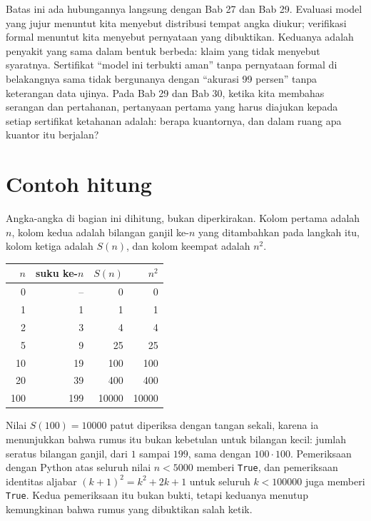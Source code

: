 Batas ini ada hubungannya langsung dengan Bab 27 dan Bab 29. Evaluasi model yang jujur menuntut
kita menyebut distribusi tempat angka diukur; verifikasi formal menuntut kita menyebut pernyataan
yang dibuktikan. Keduanya adalah penyakit yang sama dalam bentuk berbeda: klaim yang tidak
menyebut syaratnya. Sertifikat ``model ini terbukti aman'' tanpa pernyataan formal di belakangnya
sama tidak bergunanya dengan ``akurasi 99 persen'' tanpa keterangan data ujinya. Pada Bab 29 dan
Bab 30, ketika kita membahas serangan dan pertahanan, pertanyaan pertama yang harus diajukan
kepada setiap sertifikat ketahanan adalah: berapa kuantornya, dan dalam ruang apa kuantor itu
berjalan?

\section{Contoh hitung}


Angka-angka di bagian ini dihitung, bukan diperkirakan. Kolom pertama adalah $n$, kolom kedua
adalah bilangan ganjil ke-$n$ yang ditambahkan pada langkah itu, kolom ketiga adalah $S(n)$, dan
kolom keempat adalah $n^{2}$.

\begin{center}
\begin{tabular}{rrrr}
\hline
$n$ & suku ke-$n$ & $S(n)$ & $n^{2}$ \\
\hline
0  & --  & 0     & 0 \\
1  & 1   & 1     & 1 \\
2  & 3   & 4     & 4 \\
5  & 9   & 25    & 25 \\
10 & 19  & 100   & 100 \\
20 & 39  & 400   & 400 \\
100 & 199 & 10000 & 10000 \\
\hline
\end{tabular}
\end{center}

Nilai $S(100)=10000$ patut diperiksa dengan tangan sekali, karena ia menunjukkan bahwa rumus itu
bukan kebetulan untuk bilangan kecil: jumlah seratus bilangan ganjil, dari $1$ sampai $199$,
sama dengan $100\cdot 100$. Pemeriksaan dengan Python atas seluruh nilai $n<5000$ memberi
\texttt{True}, dan pemeriksaan identitas aljabar $(k+1)^{2}=k^{2}+2k+1$ untuk seluruh $k<100000$
juga memberi \texttt{True}. Kedua pemeriksaan itu bukan bukti, tetapi keduanya menutup kemungkinan
bahwa rumus yang dibuktikan salah ketik.

